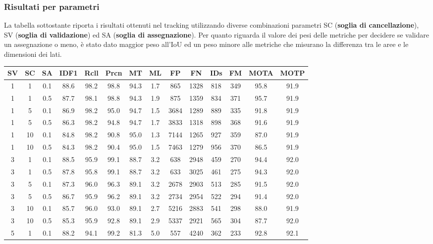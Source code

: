 \subsubsection{Risultati per parametri}
La tabella sottostante riporta i risultati ottenuti nel tracking  utilizzando diverse combinazioni parametri SC (\textbf{soglia di cancellazione}), SV (\textbf{soglia di validazione}) ed SA (\textbf{soglia di assegnazione}). Per quanto riguarda il valore dei pesi delle metriche per decidere se validare un assegnazione o meno, è stato dato maggior peso all'IoU ed un peso minore alle metriche che misurano la differenza tra le aree e le dimensioni dei lati.
\begin{table}[h!]
\centering
\begin{tabular}{|c|c|c|c|c|c|c|c|c|c|c|c|c|c|}
\hline
SV & SC & SA & IDF1 & Rcll & Prcn & MT & ML & FP & FN & IDs & FM & MOTA & MOTP\\ [0.5ex] 
\hline
1 & 1 & 0.1 & 88.6 & 98.2 & 98.8 & 94.3 & 1.7 & 865 & 1328 & 818 & 349 & 95.8 & 91.9\\
1 & 1 & 0.5 & 87.7 & 98.1 & 98.8 & 94.3 & 1.9 & 875 & 1359 & 834 & 371 & 95.7 & 91.9\\
1 & 5 & 0.1 & 86.9 & 98.2 & 95.0 & 94.7 & 1.5 & 3684 & 1289 & 889 & 335 & 91.8 & 91.9\\
1 & 5 & 0.5 & 86.3 & 98.2 & 94.8 & 94.7 & 1.7 & 3833 & 1318 & 898 & 368 & 91.6 & 91.9\\
1 & 10 & 0.1 & 84.8 & 98.2 & 90.8 & 95.0 & 1.3 & 7144 & 1265 & 927 & 359 & 87.0 & 91.9\\
1 & 10 & 0.5 & 84.3 & 98.2 & 90.4 & 95.0 & 1.5 & 7463 & 1279 & 956 & 370 & 86.5 & 91.9\\
3 & 1 & 0.1 & 88.5 & 95.9 & 99.1 & 88.7 & 3.2 & 638 & 2948 & 459 & 270 & 94.4 & 92.0\\
3 & 1 & 0.5 & 87.8 & 95.8 & 99.1 & 88.7 & 3.2 & 633 & 3025 & 461 & 275 & 94.3 & 92.0\\
3 & 5 & 0.1 & 87.3 & 96.0 & 96.3 & 89.1 & 3.2 & 2678 & 2903 & 513 & 285 & 91.5 & 92.0\\
3 & 5 & 0.5 & 86.7 & 95.9 & 96.2 & 89.1 & 3.2 & 2734 & 2954 & 522 & 294 & 91.4 & 92.0\\
3 & 10 & 0.1 & 85.7 & 96.0 & 93.0 & 89.1 & 2.7 & 5216 & 2883 & 541 & 298 & 88.0 & 91.9\\
3 & 10 & 0.5 & 85.3 & 95.9 & 92.8 & 89.1 & 2.9 & 5337 & 2921 & 565 & 304 & 87.7 & 92.0\\
5 & 1 & 0.1 & 88.2 & 94.1 & 99.2 & 81.3 & 5.0 & 557 & 4240 & 362 & 233 & 92.8 & 92.1\\

\end{tabular}
\end{table}
